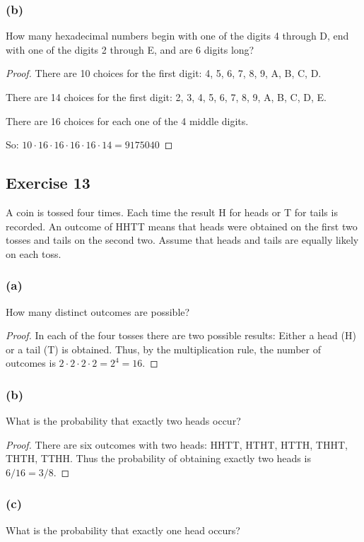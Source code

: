 \documentclass[14pt]{extarticle}
\begin{document}
\subsubsection{(b)}
How many hexadecimal numbers begin with one of the digits 4 through D, end with one of the digits 2 through E, and are 
6 digits long?

\begin{proof}
There are 10 choices for the first digit: 4, 5, 6, 7, 8, 9, A, B, C, D.

There are 14 choices for the first digit: 2, 3, 4, 5, 6, 7, 8, 9, A, B, C, D, E.

There are 16 choices for each one of the 4 middle digits.

So: \(10 \cdot 16 \cdot 16 \cdot 16 \cdot 16 \cdot 14 = 9175040\)
\end{proof}

\subsection{Exercise 13}
A coin is tossed four times. Each time the result H for heads or T for tails is recorded. An outcome of HHTT means that heads were obtained on the first two tosses and tails on the second two. Assume that heads and tails are equally likely on each toss.

\subsubsection{(a)}
How many distinct outcomes are possible?

\begin{proof}
In each of the four tosses there are two possible results: Either a head (H) or a tail (T) is obtained. Thus, by the 
multiplication rule, the number of outcomes is \(2 \cdot 2 \cdot 2 \cdot 2 = 2^4 = 16\).
\end{proof}

\subsubsection{(b)}
What is the probability that exactly two heads occur?

\begin{proof}
There are six outcomes with two heads: HHTT, HTHT, HTTH, THHT, THTH, TTHH. Thus the probability of obtaining exactly 
two heads is \(6/16 = 3/8\).
\end{proof}

\subsubsection{(c)}
What is the probability that exactly one head occurs?
\end{document}
